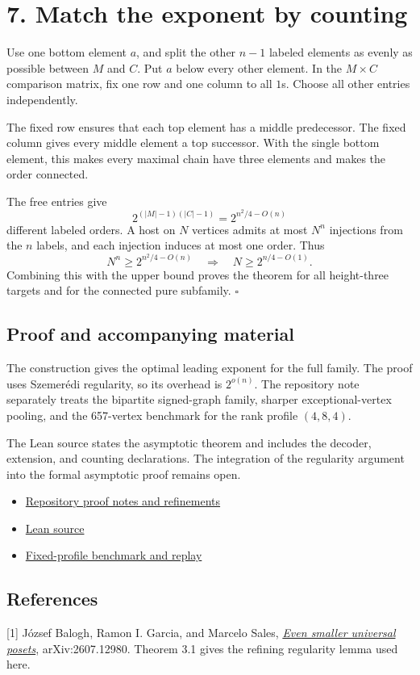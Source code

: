 \documentclass[11pt,a4paper]{article}
\newcommand{\tightlist}{\setlength{\itemsep}{2pt}\setlength{\parskip}{0pt}}
\begin{document}
\newpage

\section{7. Match the exponent by
counting}\label{match-the-exponent-by-counting}

Use one bottom element \(a\), and split the other \(n-1\) labeled
elements as evenly as possible between \(M\) and \(C\). Put \(a\) below
every other element. In the \(M\times C\) comparison matrix, fix one row
and one column to all \(1\)s. Choose all other entries independently.

The fixed row ensures that each top element has a middle predecessor.
The fixed column gives every middle element a top successor. With the
single bottom element, this makes every maximal chain have three
elements and makes the order connected.

The free entries give \[
2^{(|M|-1)(|C|-1)}=2^{n^2/4-O(n)}
\] different labeled orders. A host on \(N\) vertices admits at most
\(N^n\) injections from the \(n\) labels, and each injection induces at
most one order. Thus \[
N^n\ge 2^{n^2/4-O(n)}
\quad\Longrightarrow\quad
N\ge 2^{n/4-O(1)}.
\] Combining this with the upper bound proves the theorem for all
height-three targets and for the connected pure subfamily. \(\square\)

\subsection{Proof and accompanying
material}\label{proof-and-accompanying-material}

The construction gives the optimal leading exponent for the full family.
The proof uses Szemerédi regularity, so its overhead is \(2^{o(n)}\).
The repository note separately treats the bipartite signed-graph family,
sharper exceptional-vertex pooling, and the 657-vertex benchmark for the
rank profile \((4,8,4)\).

The Lean source states the asymptotic theorem and includes the decoder,
extension, and counting declarations. The integration of the regularity
argument into the formal asymptotic proof remains open.

\begin{itemize}
\tightlist
\item
  \href{https://github.com/hyper-analysis/universal-poset-mantel/blob/main/math/height-three-universal-posets.md}{Repository
  proof notes and refinements}
\item
  \href{https://github.com/hyper-analysis/universal-poset-mantel/blob/main/math/HeightThreeBound.lean}{Lean
  source}
\item
  \href{https://github.com/hyper-analysis/universal-poset-mantel/tree/main/experiments/height-three-universal-posets/profile-benchmark}{Fixed-profile
  benchmark and replay}
\end{itemize}

\subsection{References}\label{references}

{[}1{]} József Balogh, Ramon I. Garcia, and Marcelo Sales,
\href{https://arxiv.org/abs/2607.12980}{\emph{Even smaller universal
posets}}, arXiv:2607.12980. Theorem 3.1 gives the refining regularity
lemma used here.
\end{document}
